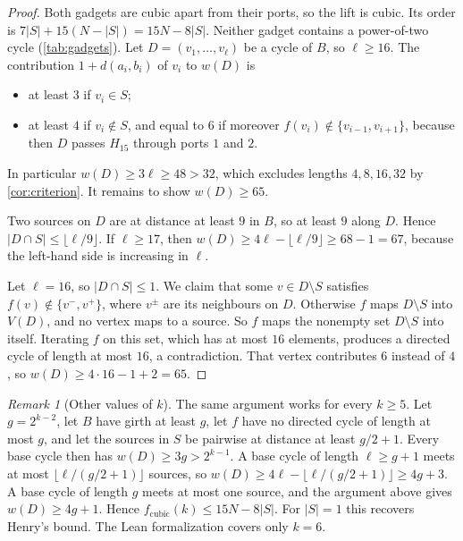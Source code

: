 \documentclass[11pt]{amsart}
\theoremstyle{definition}
\theoremstyle{remark}
\newtheorem{remark}[theorem]{Remark}
\newcommand{\fc}{f_{\mathrm{cubic}}}
\newcommand{\Hfifteen}{H_{15}}
\begin{document}
\begin{proof}
Both gadgets are cubic apart from their ports, so the lift is cubic. Its order
is $7|S|+15(N-|S|)=15N-8|S|$. Neither gadget contains a power-of-two cycle
(\cref{tab:gadgets}). Let $D=(v_1,\dots,v_\ell)$ be a cycle of $B$, so
$\ell\ge 16$. The contribution $1+d(a_i,b_i)$ of $v_i$ to $w(D)$ is
\begin{itemize}[leftmargin=1.5em]
\item at least $3$ if $v_i\in S$;
\item at least $4$ if $v_i\notin S$, and equal to $6$ if moreover
  $f(v_i)\notin\{v_{i-1},v_{i+1}\}$, because then $D$ passes $\Hfifteen$
  through ports $1$ and $2$.
\end{itemize}
In particular $w(D)\ge 3\ell\ge 48>32$, which excludes lengths $4,8,16,32$ by
\cref{cor:criterion}. It remains to show $w(D)\ge 65$.

Two sources on $D$ are at distance at least $9$ in $B$, so at least $9$ along
$D$. Hence $|D\cap S|\le\lfloor \ell/9\rfloor$. If $\ell\ge 17$, then
$w(D)\ge 4\ell-\lfloor\ell/9\rfloor\ge 68-1=67$, because the left-hand side is
increasing in $\ell$.

Let $\ell=16$, so $|D\cap S|\le 1$. We claim that some $v\in D\setminus S$
satisfies $f(v)\notin\{v^-,v^+\}$, where $v^\pm$ are its neighbours on $D$.
Otherwise $f$ maps $D\setminus S$ into $V(D)$, and no vertex maps to a source.
So $f$ maps the nonempty set $D\setminus S$ into itself. Iterating $f$ on this
set, which has at most $16$ elements, produces a directed cycle of length at
most $16$, a contradiction. That vertex contributes $6$ instead of $4$, so
$w(D)\ge 4\cdot 16-1+2=65$.
\end{proof}

\begin{remark}[Other values of $k$]\label{rem:general}
The same argument works for every $k\ge 5$. Let $g=2^{k-2}$, let $B$ have girth
at least $g$, let $f$ have no directed cycle of length at most $g$, and let the
sources in $S$ be pairwise at distance at least $g/2+1$. Every base cycle then
has $w(D)\ge 3g>2^{k-1}$. A base cycle of length $\ell\ge g+1$ meets at most
$\lfloor \ell/(g/2+1)\rfloor$ sources, so $w(D)\ge 4\ell-\lfloor\ell/(g/2+1)\rfloor\ge 4g+3$.
A base cycle of length $g$ meets at most one source, and the argument above gives
$w(D)\ge 4g+1$. Hence $\fc(k)\le 15N-8|S|$. For $|S|=1$ this recovers Henry's
bound. The Lean formalization covers only $k=6$.
\end{remark}
\end{document}
